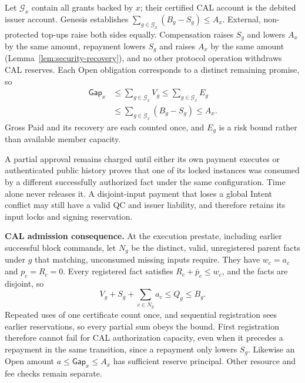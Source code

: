 \begin{IEEEproof}
Let $\mathcal G_x$ contain all grants backed by $x$; their certified CAL account is the debited issuer account. Genesis establishes $\sum_{g\in\mathcal G_x}(B_g-S_g)\le A_x$. External, non-protected top-ups raise both sides equally. Compensation raises $S_g$ and lowers $A_x$ by the same amount, repayment lowers $S_g$ and raises $A_x$ by the same amount (Lemma~\ref{lem:security-recovery}), and no other protocol operation withdraws CAL reserves. Each Open obligation corresponds to a distinct remaining promise, so
\begin{equation}
\begin{aligned}
\mathsf{Gap}_x&\le\sum_{g\in\mathcal G_x}V_g
    \le\sum_{g\in\mathcal G_x}E_g\\
   &\le\sum_{g\in\mathcal G_x}(B_g-S_g)\le A_x.
\end{aligned}
\label{eq:security-backing}
\end{equation}
Gross Paid and its recovery are each counted once, and $E_g$ is a risk bound rather than available member capacity.
\end{IEEEproof}

A partial approval remains charged until either its own payment
executes or authenticated public history proves that one of its locked
instances was consumed by a different successfully authorized fact
under the same configuration.  Time alone never releases it.
A disjoint-input payment that loses a global Intent conflict may still
have a valid QC and issuer liability, and therefore retains its input
locks and signing reservation.

\noindent\textbf{CAL admission consequence.}
At the execution prestate, including earlier successful block commands, let $N_g$ be the distinct, valid, unregistered parent facts under $g$ that matching, unconsumed missing inputs require. They have $w_c=a_c$ and $p_c=R_c=0$. Every registered fact satisfies $R_c+\bar p_c\le w_c$, and the facts are disjoint, so
\begin{equation}
 V_g+S_g+\sum_{c\in N_g}a_c\le Q_g\le B_g.
 \label{eq:security-admission}
\end{equation}
Repeated uses of one certificate count once, and sequential registration sees earlier reservations, so every partial sum obeys the bound. First registration therefore cannot fail for CAL authorization capacity, even when it precedes a repayment in the same transition, since a repayment only lowers $S_g$. Likewise an Open amount $a\le\mathsf{Gap}_x\le A_x$ has sufficient reserve principal. Other resource and fee checks remain separate.

